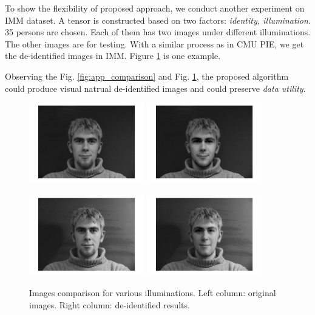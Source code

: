 To show the flexibility of proposed approach, we conduct another experiment on IMM dataset. A
tensor is constructed based on two factors: {\it identity, illumination}. 35 persons are chosen.
Each of them has two images under different illuminations. The other images are for testing.
With a similar process as in CMU PIE, we get the de-identified images in IMM. Figure 
\ref{fig:light_comparison} is one example. 

Observing the Fig. \ref{fig:app_comparison} and Fig. \ref{fig:light_comparison}, the proposed
algorithm could produce visual natrual de-identified images and could preserve {\it data utility}. 

\begin{figure}[!htb]
    \centering
    \includegraphics[width=50mm]{figure/IMM_nolight_o}
    \includegraphics[width=50mm]{figure/IMM_nolight_d}

    \includegraphics[width=50mm]{figure/IMM_light_o}
    \includegraphics[width=50mm]{figure/IMM_light_d}
    
    \caption{Images comparison for various illuminations. Left column: original 
            images. Right column: de-identified results.}
    \label{fig:light_comparison}
\end{figure}


